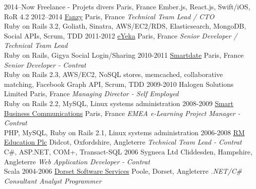\documentclass[]{friggeri-cv} %
\begin{document}
\begin{entrylist}
\entry
{2014--Now}
{Freelance - Projets divers}
{Paris, France}
{Ember.js, React.js, Swift/iOS, RoR 4.2}
\entry
{2012--2014}
{\href{https://www.crunchbase.com/organization/fanrank}{Fanzy}}
{Paris, France}
{\emph{Technical Team Lead / CTO} \\
{\color{green}Ruby on Rails 3.2, Goliath, Sinatra, AWS/EC2/RDS, Elasticsearch, MongoDB, Social APIs, Scrum, TDD}}
\entry
{2011-2012}
{\href{https://en.eyeka.com/}{eYeka}}
{Paris, France}
{\emph{Senior Developer / Technical Team Lead} \\
Ruby on Rails, Gigya Social Login/Sharing}
\entry
{2010-2011}
{\href{https://www.crunchbase.com/organization/smartdate}{Smartdate}}
{Paris, France}
{\emph{Senior Developer - Contrat} \\
Ruby on Rails 2.3, AWS/EC2, NoSQL stores, memcached, collaborative matching, Facebook Graph API, Scrum, TDD}
\entry
{2009-2010}
{Halogen Solutions Limited}
{Paris, France}
{\emph{Managing Director - Self Employed} \\
Ruby on Rails 2.2, MySQL, Linux systems administration}
\entry
{2008-2009}
{\href{http://www.smartbusinesscom.fr/}{Smart Business Communications}}
{Paris, France}
{\emph{EMEA e-Learning Project Manager - Contrat} \\
PHP, MySQL, Ruby on Rails 2.1, Linux systems administration}
\entry
{2006-2008}
{\href{http://www.rm.com/}{RM Education Plc}}
{Didcot, Oxfordshire, Angleterre}
{\emph{Technical Team Lead - Contrat} \\
C\#, ASP.NET, COM+, Transact-SQL}
\entry
{2006}
{Sygneca Ltd}
{Cliddesden, Hampshire, Angleterre}
{\emph{Web Application Developer - Contrat} \\
Scala}
\entry
{2004-2006}
{\href{http://www.dorsetsoftware.com/}{Dorset Software Services}}
{Poole, Dorset, Angleterre}
{\emph{.NET/C\# Consultant Analyst Programmer}}
\end{entrylist}

\end{document}

